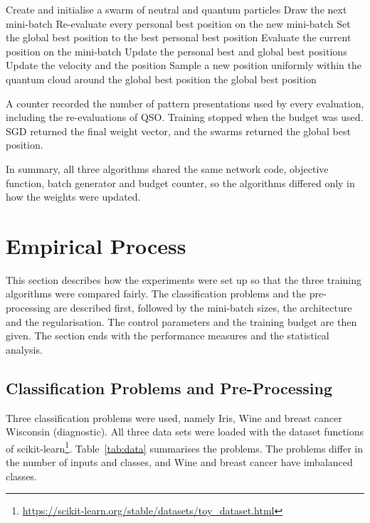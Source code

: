 \documentclass[conference]{IEEEtran}
\begin{document}
\begin{algorithm}[t]
\caption{Quantum-inspired particle swarm optimisation for mini-batch training}
\label{alg:qso}
\begin{algorithmic}[1]
\State Create and initialise a swarm of neutral and quantum particles
\Repeat
  \State Draw the next mini-batch
  \State Re-evaluate every personal best position on the new mini-batch
  \State Set the global best position to the best personal best position
    \State Evaluate the current position on the mini-batch
    \State Update the personal best and global best positions
  \EndFor
    \State Update the velocity and the position
  \EndFor
    \State Sample a new position uniformly within the quantum cloud
    \Statex \hspace{\algorithmicindent}\hspace{\algorithmicindent}around the global best position
  \EndFor
{}
\State \Return the global best position
\end{algorithmic}
\end{algorithm}

A counter recorded the number of pattern presentations used by every
evaluation, including the re-evaluations of QSO. Training stopped when
the budget was used. SGD returned the final weight vector, and the
swarms returned the global best position.

In summary, all three algorithms shared the same network code,
objective function, batch generator and budget counter, so the
algorithms differed only in how the weights were updated.

\section{Empirical Process}
\label{sec:emp}
This section describes how the experiments were set up so that the
three training algorithms were compared fairly. The classification
problems and the pre-processing are described first, followed by the
mini-batch sizes, the architecture and the regularisation. The control
parameters and the training budget are then given. The section ends
with the performance measures and the statistical analysis.

\subsection{Classification Problems and Pre-Processing}
Three classification problems were used, namely Iris, Wine and breast
cancer Wisconsin (diagnostic). All three data sets were loaded with
the dataset functions of
scikit-learn\footnote{\url{https://scikit-learn.org/stable/datasets/toy_dataset.html}}.
Table~\ref{tab:data} summarises the problems. The problems differ in
the number of inputs and classes, and Wine and breast cancer have
imbalanced classes.
\end{document}
